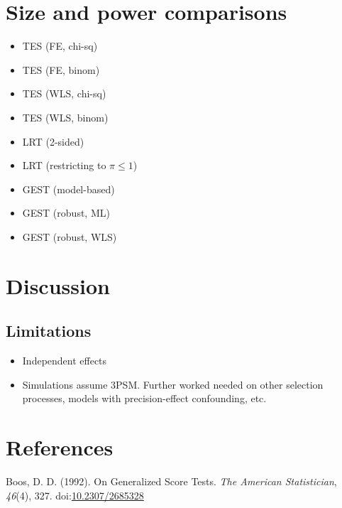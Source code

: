 \documentclass[man,floatsintext]{apa6}
\providecommand{\tightlist}{%
  \setlength{\itemsep}{0pt}\setlength{\parskip}{0pt}}
\begin{document}
\hypertarget{simulations}{%
\section{Size and power comparisons}\label{simulations}}

\begin{itemize}
\tightlist
\item
  TES (FE, chi-sq)
\item
  TES (FE, binom)
\item
  TES (WLS, chi-sq)
\item
  TES (WLS, binom)
\item
  LRT (2-sided)
\item
  LRT (restricting to \(\pi \leq 1\))
\item
  GEST (model-based)
\item
  GEST (robust, ML)
\item
  GEST (robust, WLS)
\end{itemize}

\hypertarget{discussion}{%
\section{Discussion}\label{discussion}}

\hypertarget{limitations}{%
\subsection{Limitations}\label{limitations}}

\begin{itemize}
\tightlist
\item
  Independent effects
\item
  Simulations assume 3PSM. Further worked needed on other selection processes, models with precision-effect confounding, etc.
\end{itemize}

\newpage

\hypertarget{references}{%
\section{References}\label{references}}

\begingroup
\setlength{\parindent}{-0.5in}
\setlength{\leftskip}{0.5in}

\hypertarget{refs}{}
\leavevmode\hypertarget{ref-boos1992GeneralizedScoreTests}{}%
Boos, D. D. (1992). On Generalized Score Tests. \emph{The American Statistician}, \emph{46}(4), 327. doi:\href{https://doi.org/10.2307/2685328}{10.2307/2685328}
\end{document}
